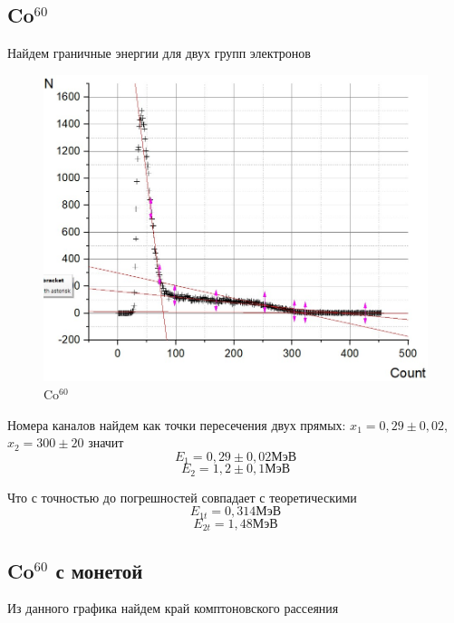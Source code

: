 \documentclass[a4paper, 12pt]{article}%
\begin{document}
\subsection*{Co$^{60}$}
Найдем граничные энергии для двух групп электронов 
\begin{figure}[h]
\begin{center}
\includegraphics[width = \textwidth]{13.jpg}
\caption{Co$^{60}$}
\end{center}
\end{figure}

Номера каналов найдем как точки пересечения двух прямых: $x_1 = 0,29 \pm 0,02$, $x_2 = 300 \pm 20$ значит
\[E_1 = 0,29 \pm 0,02 \text{МэВ}\]
\[E_2 = 1,2 \pm 0,1 \text{МэВ}\]

Что с точностью до погрешностей совпадает с теоретическими
\[E_{1t} = 0,314 \text{МэВ}\]
\[E_{2t} = 1,48 \text{МэВ}\]
\newpage
\subsection*{Co$^{60}$ с монетой}
Из данного графика найдем край комптоновского рассеяния
\end{document}
